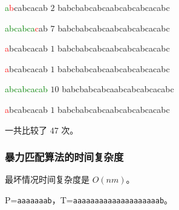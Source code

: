 \documentclass{ctexbeamer}
\newcommand{\red}[1]{\textcolor{red}{#1}}
\newcommand{\green}[1]{\textcolor{green}{#1}}
\begin{document}
\begin{frame}[fragile]
\begin{minipage}[t]{.5\textwidth}
\begin{tverb}
           \green{a}\red{b}cabcacab \(2\)
babcbabcabcaabcabcabcacabc
    	\end{tverb}

\begin{tverb}
            \green{abcabca}\red{c}ab \(7\)
babcbabcabcaabcabcabcacabc
            	\end{tverb}

\begin{tverb}
             \red{a}bcabcacab \(1\)
babcbabcabcaabcabcabcacabc
\end{tverb}

\begin{tverb}
              \red{a}bcabcacab \(1\)
babcbabcabcaabcabcabcacabc
            	\end{tverb}

\begin{tverb}
               \green{abcabcacab} \(10\)
babcbabcabcaabcabcabcacabc
\end{tverb}

\begin{tverb}
                \red{a}bcabcacab \(1\)
babcbabcabcaabcabcabcacabc
            	\end{tverb}


\end{minipage}



一共比较了 $47$ 次。

\end{frame}

\begin{frame}
	\frametitle{暴力匹配算法的时间复杂度}

最坏情况时间复杂度是 $O(nm)$。


P=\texttt{aaaaaaab}，T=\texttt{aaaaaaaaaaaaaaaaaaaab}。
\end{frame}
\end{document}
